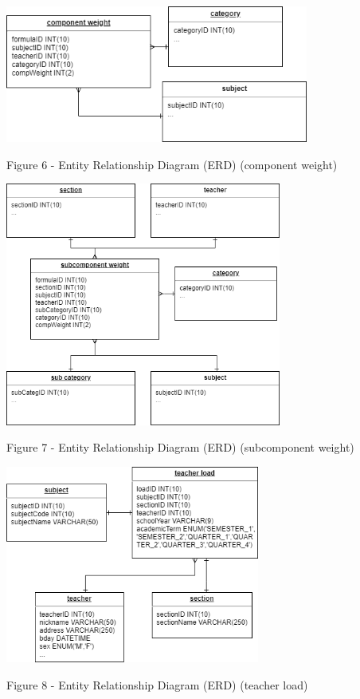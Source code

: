 \documentclass[11pt,a4paper,titlepage]{article}
\begin{document}
\vspace{1cm}
\begin{center}
    \includegraphics[height=4.5cm]{Component-Weight.png}
\end{center}
\vspace{1cm}
\begin{center}
    Figure 6 - Entity Relationship Diagram (ERD) (component weight)
\end{center}


\vspace{1cm}
\begin{center}
    \includegraphics[height=8.0cm]{Subcomponent-Weight.png}
\end{center}
\vspace{1cm}
\begin{center}
    Figure 7 - Entity Relationship Diagram (ERD) (subcomponent weight)
\end{center}

\vspace{1cm}
\begin{center}
    \includegraphics[height=6.5cm]{Teacher-Load.png}
\end{center}
\vspace{1cm}
\begin{center}
    Figure 8 - Entity Relationship Diagram (ERD) (teacher load)
\end{center}
\end{document}
